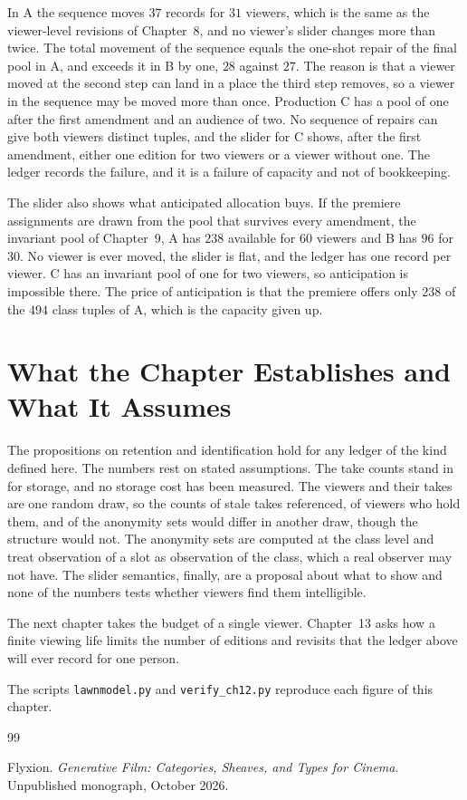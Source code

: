 \documentclass[11pt,twoside,openright]{book}
\theoremstyle{plain}
\theoremstyle{definition}
\theoremstyle{remark}
\begin{document}
In A the sequence moves $37$ records for $31$ viewers, which is the same as the viewer-level revisions of Chapter~8, and no viewer's slider changes more than twice. The total movement of the sequence equals the one-shot repair of the final pool in A, and exceeds it in B by one, $28$ against $27$. The reason is that a viewer moved at the second step can land in a place the third step removes, so a viewer in the sequence may be moved more than once. Production C has a pool of one after the first amendment and an audience of two. No sequence of repairs can give both viewers distinct tuples, and the slider for C shows, after the first amendment, either one edition for two viewers or a viewer without one. The ledger records the failure, and it is a failure of capacity and not of bookkeeping.

The slider also shows what anticipated allocation buys. If the premiere assignments are drawn from the pool that survives every amendment, the invariant pool of Chapter~9, A has $238$ available for $60$ viewers and B has $96$ for $30$. No viewer is ever moved, the slider is flat, and the ledger has one record per viewer. C has an invariant pool of one for two viewers, so anticipation is impossible there. The price of anticipation is that the premiere offers only $238$ of the $494$ class tuples of A, which is the capacity given up.

\section{What the Chapter Establishes and What It Assumes}\label{sec:limits12}

The propositions on retention and identification hold for any ledger of the kind defined here. The numbers rest on stated assumptions. The take counts stand in for storage, and no storage cost has been measured. The viewers and their takes are one random draw, so the counts of stale takes referenced, of viewers who hold them, and of the anonymity sets would differ in another draw, though the structure would not. The anonymity sets are computed at the class level and treat observation of a slot as observation of the class, which a real observer may not have. The slider semantics, finally, are a proposal about what to show and none of the numbers tests whether viewers find them intelligible.

The next chapter takes the budget of a single viewer. Chapter~13 asks how a finite viewing life limits the number of editions and revisits that the ledger above will ever record for one person.

The scripts \texttt{lawnmodel.py} and \texttt{verify\_ch12.py} reproduce each figure of this chapter.

\begin{thebibliography}{99}

Flyxion.
\newblock \emph{Generative Film: Categories, Sheaves, and Types for Cinema}.
\newblock Unpublished monograph, October 2026.

\end{thebibliography}
\end{document}
